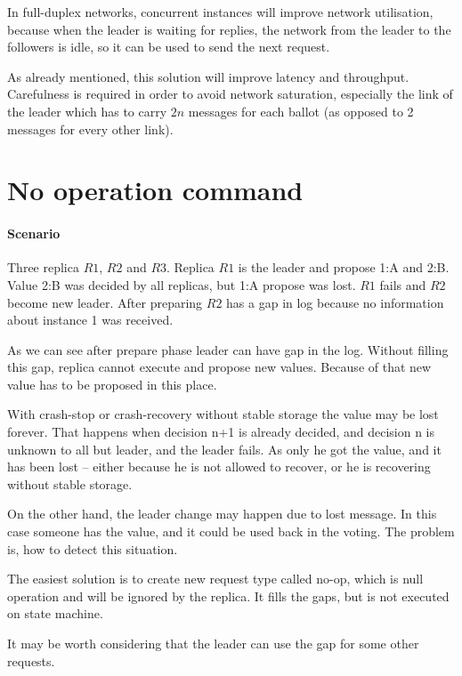 In full-duplex networks, concurrent instances will improve network utilisation, because when the leader is waiting for replies, the network from the leader to the followers is idle, so it can be used to send the next request. 

As already mentioned, this solution will improve latency and throughput. Carefulness is required in order to avoid network saturation, especially the link of the leader which has to carry $2n$ messages for each ballot (as opposed to 2 messages for every other link).

\section{No operation command}
\paragraph{Scenario}
Three replica $R1$, $R2$ and $R3$. Replica $R1$ is the leader and propose {1:A} and {2:B}. Value {2:B} was decided by all replicas, but {1:A} propose was lost. $R1$ fails and $R2$ become new leader. After preparing $R2$ has a gap in log because no information about instance 1 was received. 

As we can see after prepare phase leader can have gap in the log. Without filling this gap, replica cannot execute and propose new values. Because of that new value has to be proposed in this place.

With crash-stop or crash-recovery without stable storage the value may be lost forever. That happens when decision n+1 is already decided, and decision n is unknown to all but leader, and the leader fails. As only he got the value, and it has been lost -- either because he is not allowed to recover, or he is recovering without stable storage.

On the other hand, the leader change may happen due to lost \alive message. In this case someone has the value, and it could be used back in the voting. The problem is, how to detect this situation.

The easiest solution is to create new request type called no-op, which is null operation and will be ignored by the replica. It fills the gaps, but is not executed on state machine.

It may be worth considering that the leader can use the gap for some other requests. 

